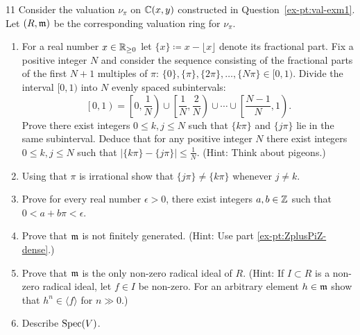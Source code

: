 \documentclass[Notebook.tex]{subfiles}
\begin{document}
    \begin{problem}{11}
        Consider the valuation $\nu_{\pi}$ on $\mathbb C(x,y)$ constructed in Question~\ref{ex-pt:val-exm1}. Let $(R,\operatorname{\mathfrak{m}})$ be the corresponding valuation ring for $\nu_{\pi}$.
        \begin{enumerate}[label=(\alph*),ref=\theenumi\alph*]
            \item For a real number $x \in \mathbb R_{\geq 0}$ let $\{x\}\coloneqq x - \lfloor x \rfloor$ denote its fractional part. Fix a positive integer $N$ and consider the sequence consisting of the fractional parts of the first $N+1$ multiples of $\pi$: $\{0\}, \{\pi\}, \{2\pi\},\ldots,\{N\pi\} \in [0,1)$. Divide the interval $[0,1)$ into $N$ evenly spaced subintervals: 
            \[
            \left[0, 1\right) = \left[0,\frac{1}{N}\right) \cup \left[\frac{1}{N},\frac{2}{N}\right)\cup \cdots \cup \left[\frac{N-1}{N},1\right).
            \] 
            Prove there exist integers $0\leq k,j\leq N$ such that $\{k\pi\}$ and $\{j\pi\}$ lie in the same subinterval. Deduce that for any positive integer $N$ there exist integers $0\leq k,j\leq N$ such that $|\{k\pi\} - \{j\pi\}| \leq \frac{1}{N}$. (Hint: Think about pigeons.)
            \item Using that $\pi$ is irrational show that $\{j\pi\}\neq \{k\pi\}$ whenever $j\neq k$. 
            \item\label{ex-pt:ZplusPiZ-dense} Prove for every real number $\epsilon>0$, there exist integers $a,b\in \mathbb Z$ such that $0 < a+b\pi < \epsilon$. 
            \item Prove that $\operatorname{\mathfrak{m}}$ is not finitely generated. (Hint: Use part \ref{ex-pt:ZplusPiZ-dense}.)
            \item Prove that $\operatorname{\mathfrak{m}}$ is the only non-zero radical ideal of $R$. (Hint: If $I \subset R$ is a non-zero radical ideal, let $f \in I$ be non-zero. For an arbitrary element $h \in \operatorname{\mathfrak{m}}$ show that $h^{n} \in \langle f \rangle$ for $n \gg0$.)
            \item Describe $\operatorname{Spec}(V)$. 
        \end{enumerate}
    \end{problem}
 
\end{document}
